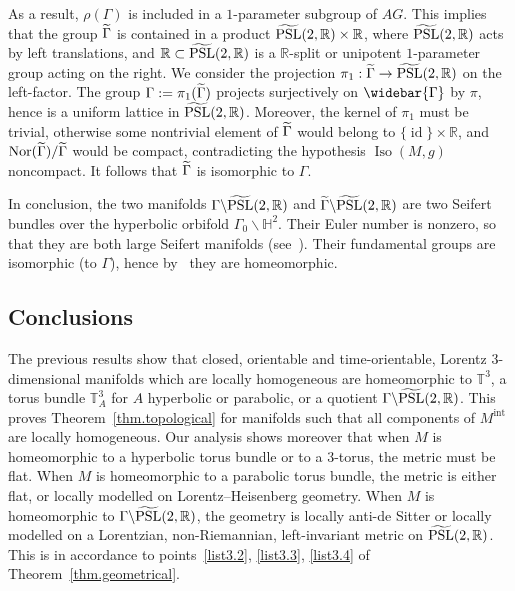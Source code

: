 \documentclass[11pt]{article}
\theoremstyle{definition}
\numberwithin{equation}{section}
\numberwithin{figure}{section}
\numberwithin{table}{section}
\DeclareMathOperator{\Iso}{Iso}
\DeclareMathOperator{\Nor}{Nor}
\DeclareMathOperator{\PSL}{PSL}
\DeclareMathOperator{\id}{id}
\newcommand{\mint}{{M^{\intl}}}
\DeclareMathOperator{\intl}{int}
\newcommand*\TT{\mathbb{T}}
\newcommand*\RR{\mathbb{R}}
\let\oldtilde\tilde
\renewcommand*\tilde[1]{\mathchoice{\widetilde{#1}}{\widetilde{#1}}{\widetilde{#1}}{\oldtilde{#1}}}
\let\oldbar\bar
\renewcommand*{\bar}[1]{\mathchoice{\widebar{#1}}{\widebar{#1}}{\oldbar{#1}}{\oldbar{#1}}}
\renewcommand*{\overline}{\bar}
\begin{document}
As a result, $\rho(\Gamma)$ is included in a $1$-parameter subgroup of $AG$. This implies that the group $\tilde{\Gamma}$ is contained in a product $\tilde{\PSL}(2,\RR) \times \RR$, where $\tilde{\PSL}(2,\RR)$ acts by left translations, and $\RR \subset \tilde{\PSL}(2,\RR)$ is a $\RR$-split or unipotent $1$-parameter group acting on the right. We consider the projection $\pi_1: \tilde{\Gamma} \to \tilde{\PSL}(2,\RR)$ on the left-factor. The group $\Gamma:=\pi_1(\tilde{\Gamma})$ projects surjectively on $\overline{\Gamma}$ by $\pi$, hence is a uniform lattice in $\tilde{\PSL}(2,\RR)$. Moreover, the kernel of $\pi_1$ must be trivial, otherwise some nontrivial element of $\tilde{\Gamma}$ would belong to $\{\id \} \times \RR$, and $\Nor(\tilde{\Gamma})/\tilde{\Gamma}$ would be compact, contradicting the hypothesis $\Iso(M,g)$ noncompact. It follows that $\tilde{\Gamma}$ is isomorphic to $\Gamma$.

In conclusion, the two manifolds $\Gamma \backslash \tilde{\PSL}(2,\RR)$ and $\tilde{\Gamma} \backslash \tilde{\PSL}(2,\RR)$ are two Seifert bundles over the hyperbolic orbifold $\Gamma_0 \backslash {\mathbb H}^2$. Their Euler number is nonzero, so that they are both large Seifert manifolds (see~\cite[p.~92]{orlik}). Their fundamental groups are isomorphic (to $\Gamma$), hence by~\cite[Theorem~6, p.~97]{orlik} they are homeomorphic.



\subsection{Conclusions}
The previous results show that closed, orientable and time-orientable, Lorentz $3$-dimensional manifolds which are locally homogeneous are homeomorphic to $\TT^3$, a torus bundle $\TT_A^3$ for $A$ hyperbolic or parabolic, or a quotient $\Gamma \backslash \tilde{\PSL}(2,\RR)$. This proves Theorem~\ref{thm.topological} for manifolds such that all components of $\mint$ are locally homogeneous. Our analysis shows moreover that when $M$ is homeomorphic to a hyperbolic torus bundle or to a $3$-torus, the metric must be flat. When $M$ is homeomorphic to a parabolic torus bundle, the metric is either flat, or locally modelled on Lorentz--Heisenberg geometry. When $M$ is homeomorphic to $\Gamma \backslash \tilde{\PSL}(2,\RR)$, the geometry is locally anti-de Sitter or locally modelled on a Lorentzian, non-Riemannian, left-invariant metric on $\tilde{\PSL}(2,\RR)$. This is in accordance to points~\eqref{list3.2}, \eqref{list3.3}, \eqref{list3.4} of Theorem~\ref{thm.geometrical}.
\end{document}
